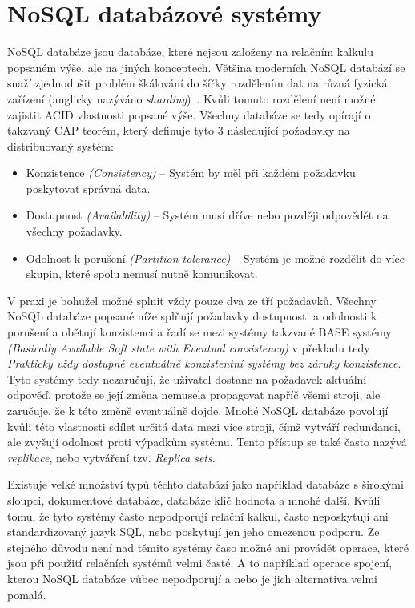 \section{NoSQL databázové systémy}
NoSQL databáze jsou databáze, které nejsou založeny na relačním kalkulu popsaném výše, ale na jiných konceptech. Většina moderních NoSQL databází se snaží zjednodušit problém škálování do šířky rozdělením dat na různá fyzická zařízení (anglicky nazýváno \textit{sharding})~\cite{7327194}. Kvůli tomuto rozdělení není možné zajistit ACID vlastnosti popsané výše. Všechny databáze se tedy opírají o takzvaný CAP \cite{6122006} teorém, který definuje tyto 3 následující požadavky na distribuovaný systém:

\begin{itemize}
\item Konzistence \textit{(Consistency)} -- Systém by měl při každém požadavku poskytovat správná data.
\item Dostupnost \textit{(Availability)} -- Systém musí dříve nebo později odpovědět na všechny požadavky.
\item Odolnost k porušení \textit{(Partition tolerance)} -- Systém je možné rozdělit do více skupin, které spolu nemusí nutně komunikovat.
\end{itemize}

V praxi je bohužel možné splnit vždy pouze dva ze tří požadavků. Všechny NoSQL databáze popsané níže splňují požadavky dostupnosti a odolnosti k porušení a obětují konzistenci a řadí se mezi systémy takzvané BASE \cite{OvercomingCap} systémy \textit{(Basically Available Soft state with Eventual consistency)} v překladu tedy \textit{Prakticky vždy dostupné eventuálně konzistentní systémy bez záruky konzistence}. Tyto systémy tedy nezaručují, že uživatel dostane na požadavek aktuální odpověď, protože se její změna nemusela propagovat napříč všemi stroji, ale zaručuje, že k této změně eventuálně dojde. Mnohé NoSQL databáze povolují kvůli této vlastnosti sdílet určitá data mezi více stroji, čímž vytváří redundanci, ale zvyšují odolnost proti výpadkům systému. Tento přístup se také často nazývá \textit{replikace}, nebo vytváření tzv. \textit{Replica sets}.

Existuje velké množství typů těchto databází jako například databáze s širokými sloupci, dokumentové databáze, databáze klíč hodnota a mnohé další. Kvůli tomu, že tyto systémy často nepodporují relační kalkul, často neposkytují ani standardizovaný jazyk SQL, nebo poskytují jen jeho omezenou podporu. Ze stejného důvodu není nad těmito systémy časo možné ani provádět operace, které jsou při použití relačních systémů velmi časté. A to například operace spojení, kterou NoSQL databáze vůbec nepodporují a nebo je jich alternativa velmi pomalá. 

